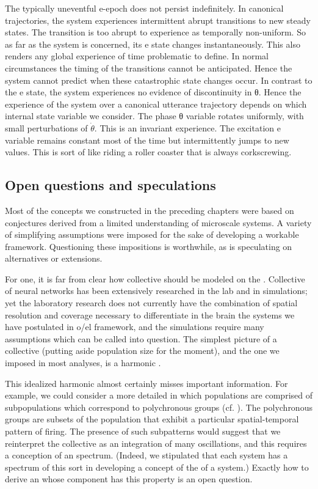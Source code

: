   The typically uneventful e-epoch does not persist indefinitely. In canonical trajectories, the system experiences intermittent abrupt transitions to new steady states. The transition is too abrupt to experience as temporally non-uniform. So as far as the system is concerned, its e state changes instantaneously. This also renders any global experience of time problematic to define. In normal circumstances the timing of the transitions cannot be anticipated. Hence the system cannot predict when these catastrophic state changes occur. In contrast to the e state, the system experiences no evidence of discontinuity in θ. Hence the experience of the system over a canonical utterance trajectory depends on which internal state variable we consider. The phase θ variable rotates uniformly, with small perturbations of $\dot{\theta}$. This is an invariant experience. The excitation e variable remains constant most of the time but intermittently jumps to new values. This is sort of like riding a roller coaster that is always corkscrewing.

\subsection{Open questions and speculations}

Most of the  concepts we constructed in the preceding chapters were based on conjectures derived from a limited understanding of microscale systems. A variety of simplifying assumptions were imposed for the sake of developing a workable framework. Questioning these impositions is worthwhile, as is speculating on alternatives or extensions.

  For one, it is far from clear how collective  should be modeled on the . Collective  of neural networks has been extensively researched in the lab and in simulations; yet the laboratory research does not currently have the combination of spatial resolution and coverage necessary to differentiate in the brain the systems we have postulated in o/el framework, and the simulations require many assumptions which can be called into question. The simplest picture of a collective  (putting aside population size for the moment), and the one we imposed in most analyses, is a harmonic .

  This idealized harmonic  almost certainly misses important information. For example, we could consider a more detailed  in which populations are comprised of subpopulations which correspond to polychronous groups (cf. \citealt{Izhikevich2006}). The polychronous groups are subsets of the population that exhibit a particular spatial-temporal pattern of firing. The presence of such subpatterns would suggest that we reinterpret the collective  as an integration of many oscillations, and this requires a  conception of an  spectrum. (Indeed, we stipulated that each system has a spectrum of this sort in developing a concept of the  of a system.) Exactly how to derive an  whose  component has this property is an open question.


